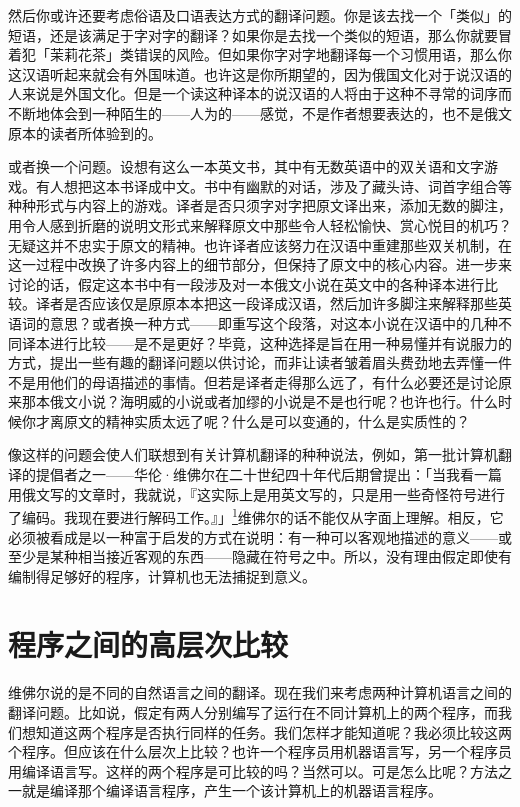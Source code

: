 \documentclass[
  12pt,
  twoside,
  openright,
  oldfontcommands,
]{memoir}
\begin{document}
然后你或许还要考虑俗语及口语表达方式的翻译问题。你是该去找一个「类似」的短语，还是该满足于字对字的翻译？如果你是去找一个类似的短语，那么你就要冒着犯「茉莉花茶」类错误的风险。但如果你字对字地翻译每一个习惯用语，那么你这汉语听起来就会有外国味道。也许这是你所期望的，因为俄国文化对于说汉语的人来说是外国文化。但是一个读这种译本的说汉语的人将由于这种不寻常的词序而不断地体会到一种陌生的------人为的------感觉，不是作者想要表达的，也不是俄文原本的读者所体验到的。

或者换一个问题。设想有这么一本英文书，其中有无数英语中的双关语和文字游戏。有人想把这本书译成中文。书中有幽默的对话，涉及了藏头诗、词首字组合等种种形式与内容上的游戏。译者是否只须字对字把原文译出来，添加无数的脚注，用令人感到折磨的说明文形式来解释原文中那些令人轻松愉快、赏心悦目的机巧？无疑这并不忠实于原文的精神。也许译者应该努力在汉语中重建那些双关机制，在这一过程中改换了许多内容上的细节部分，但保持了原文中的核心内容。进一步来讨论的话，假定这本书中有一段涉及对一本俄文小说在英文中的各种译本进行比较。译者是否应该仅是原原本本把这一段译成汉语，然后加许多脚注来解释那些英语词的意思？或者换一种方式------即重写这个段落，对这本小说在汉语中的几种不同译本进行比较------是不是更好？毕竟，这种选择是旨在用一种易懂并有说服力的方式，提出一些有趣的翻译问题以供讨论，而非让读者皱着眉头费劲地去弄懂一件不是用他们的母语描述的事情。但若是译者走得那么远了，有什么必要还是讨论原来那本俄文小说？海明威的小说或者加缪的小说是不是也行呢？也许也行。什么时候你才离原文的精神实质太远了呢？什么是可以变通的，什么是实质性的？

像这样的问题会使人们联想到有关计算机翻译的种种说法，例如，第一批计算机翻译的提倡者之一------华伦·维佛尔在二十世纪四十年代后期曾提出：「{当我看一篇用俄文写的文章时，我就说，『这实际上是用英文写的，只是用一些奇怪符号进行了编码。我现在要进行解码工作。』}」\hyperref[fn:Chapter12-1]{\textsuperscript{1}}维佛尔的话不能仅从字面上理解。相反，它必须被看成是以一种富于启发的方式在说明：有一种可以客观地描述的意义------或至少是某种相当接近客观的东西------隐藏在符号之中。所以，没有理由假定即使有编制得足够好的程序，计算机也无法捕捉到意义。

\section{程序之间的高层次比较}

维佛尔说的是不同的自然语言之间的翻译。现在我们来考虑两种计算机语言之间的翻译问题。比如说，假定有两人分别编写了运行在不同计算机上的两个程序，而我们想知道这两个程序是否执行同样的任务。我们怎样才能知道呢？我必须比较这两个程序。但应该在什么层次上比较？也许一个程序员用机器语言写，另一个程序员用编译语言写。这样的两个程序是可比较的吗？当然可以。可是怎么比呢？方法之一就是编译那个编译语言程序，产生一个该计算机上的机器语言程序。
\end{document}
